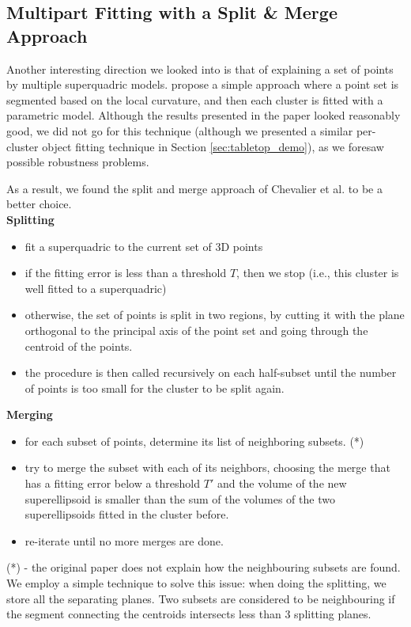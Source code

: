 \documentclass{article}
\begin{document}
\subsection {Multipart Fitting with a Split \& Merge Approach}

Another interesting direction we looked into is that of explaining a set of points by multiple superquadric models. \cite{doi:10.1117/1.1762516} propose a simple approach where a point set is segmented based on the local curvature, and then each cluster is fitted with a parametric model. Although the results presented in the paper looked reasonably good, we did not go for this technique (although we presented a similar per-cluster object fitting technique in Section \ref{sec:tabletop_demo}), as we foresaw possible robustness problems.

As a result, we found the split and merge approach of Chevalier et al. \cite{conf/wscg/ChevalierJB03} to be a better choice. \\

\textbf{Splitting}
\begin{itemize}
	\item {fit a superquadric to the current set of 3D points}
	\item {if the fitting error is less than a threshold $T$, then we stop (i.e., this cluster is well fitted to a superquadric)}
	\item {otherwise, the set of points is split in two regions, by cutting it with the plane orthogonal to the principal axis of the point set and going through the centroid of the points.}
	\item {the procedure is then called recursively on each half-subset until the number of points is too small for the cluster to be split again.}
\end{itemize}

\textbf{Merging}
\begin{itemize}
	\item {for each subset of points, determine its list of neighboring subsets. (*)}
	\item {try to merge the subset with each of its neighbors, choosing the merge that has a fitting error below a threshold $T'$ and the volume of the new superellipsoid is smaller than the sum of the volumes of the two superellipsoids fitted in the cluster before.}
	\item {re-iterate until no more merges are done.}
\end{itemize}

(*) - the original paper does not explain how the neighbouring subsets are found. We employ a simple technique to solve this issue: when doing the splitting, we store all the separating planes. Two subsets are considered to be neighbouring if the segment connecting the centroids intersects less than 3 splitting planes.
\end{document}
